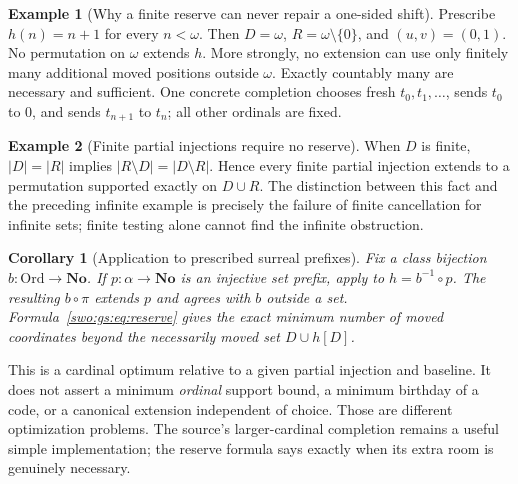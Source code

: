 \documentclass[11pt]{article}
\newtheorem{corollary}[corollary]{Corollary}
\theoremstyle{definition}
\newtheorem{example}[example]{Example}
\theoremstyle{remark}
\newcommand{\No}{\mathbf{No}}
\newcommand{\Ord}{\mathrm{Ord}}
\begin{document}
\begin{example}[Why a finite reserve can never repair a one-sided shift]\label{swo:gs:n7.2}
Prescribe $h(n)=n+1$ for every $n<\omega$. Then $D=\omega$,
$R=\omega\setminus\{0\}$, and $(u,v)=(0,1)$. No permutation on
$\omega$ extends $h$. More strongly, no extension can use only finitely
many additional moved positions outside $\omega$. Exactly countably many
are necessary and sufficient. One concrete completion chooses fresh
$t_0,t_1,\ldots$, sends $t_0$ to $0$, and sends $t_{n+1}$ to $t_n$;
all other ordinals are fixed.
\end{example}

\begin{example}[Finite partial injections require no reserve]\label{swo:gs:n7.3}
When $D$ is finite, $|D|=|R|$ implies $|R\setminus D|=|D\setminus R|$.
Hence every finite partial injection extends to a permutation supported
exactly on $D\cup R$. The distinction between this fact and the preceding
infinite example is precisely the failure of finite cancellation for
infinite sets; finite testing alone cannot find the infinite obstruction.
\end{example}

\begin{corollary}[Application to prescribed surreal prefixes]
\label{swo:gs:cor:optimal-prefix}
Fix a class bijection $b:\Ord\to\No$. If $p:\alpha\to\No$ is an
injective set prefix, apply  to
$h=b^{-1}\circ p$. The resulting $b\circ\pi$ extends $p$ and agrees
with $b$ outside a set. Formula~\eqref{swo:gs:eq:reserve} gives the exact minimum
number of moved coordinates beyond the necessarily moved set
$D\cup h[D]$.
\end{corollary}

This is a cardinal optimum relative to a given partial injection and
baseline. It does not assert a minimum \emph{ordinal} support bound, a
minimum birthday of a code, or a canonical extension independent of
choice. Those are different optimization problems. The source's
larger-cardinal completion remains a useful simple implementation; the
reserve formula says exactly when its extra room is genuinely necessary.
\end{document}
